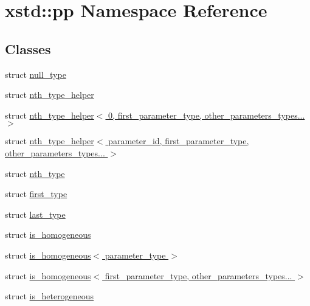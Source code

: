 \hypertarget{namespacexstd_1_1pp}{\section{xstd\-:\-:pp Namespace Reference}
\label{namespacexstd_1_1pp}
}
\subsection*{Classes}
\begin{DoxyCompactItemize}
\item 
struct \hyperlink{structxstd_1_1pp_1_1null__type}{null\-\_\-type}
\item 
struct \hyperlink{structxstd_1_1pp_1_1nth__type__helper}{nth\-\_\-type\-\_\-helper}
\item 
struct \hyperlink{structxstd_1_1pp_1_1nth__type__helper_3_010_00_01first__parameter__type_00_01other__parameters__types_8_8_8_01_4}{nth\-\_\-type\-\_\-helper$<$ 0, first\-\_\-parameter\-\_\-type, other\-\_\-parameters\-\_\-types... $>$}
\item 
struct \hyperlink{structxstd_1_1pp_1_1nth__type__helper_3_01parameter__id_00_01first__parameter__type_00_01other__parameters__types_8_8_8_01_4}{nth\-\_\-type\-\_\-helper$<$ parameter\-\_\-id, first\-\_\-parameter\-\_\-type, other\-\_\-parameters\-\_\-types... $>$}
\item 
struct \hyperlink{structxstd_1_1pp_1_1nth__type}{nth\-\_\-type}
\item 
struct \hyperlink{structxstd_1_1pp_1_1first__type}{first\-\_\-type}
\item 
struct \hyperlink{structxstd_1_1pp_1_1last__type}{last\-\_\-type}
\item 
struct \hyperlink{structxstd_1_1pp_1_1is__homogeneous}{is\-\_\-homogeneous}
\item 
struct \hyperlink{structxstd_1_1pp_1_1is__homogeneous_3_01parameter__type_01_4}{is\-\_\-homogeneous$<$ parameter\-\_\-type $>$}
\item 
struct \hyperlink{structxstd_1_1pp_1_1is__homogeneous_3_01first__parameter__type_00_01other__parameters__types_8_8_8_01_4}{is\-\_\-homogeneous$<$ first\-\_\-parameter\-\_\-type, other\-\_\-parameters\-\_\-types... $>$}
\item 
struct \hyperlink{structxstd_1_1pp_1_1is__heterogeneous}{is\-\_\-heterogeneous}
\end{DoxyCompactItemize}

